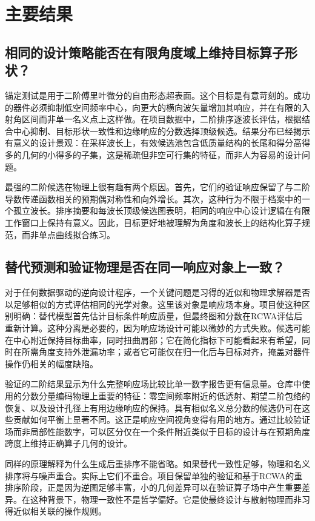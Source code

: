 \section{主要结果}

\subsection{相同的设计策略能否在有限角度域上维持目标算子形状？}

锚定测试是用于二阶傅里叶微分的自由形态超表面。这个目标是有意苛刻的。成功的器件必须抑制低空间频率中心，向更大的横向波矢量增加其响应，并在有限的入射角区间而非单一名义点上这样做。在项目数据中，二阶排序逐波长评估，根据结合中心抑制、目标形状一致性和边缘响应的分数选择顶级候选。结果分布已经揭示有意义的设计景观：在采样波长上，有效候选池包含低质量结构的长尾和得分高得多的几何的小得多的子集，这是稀疏但非空可行集的特征，而非人为容易的设计问题。

最强的二阶候选在物理上很有趣有两个原因。首先，它们的验证响应保留了与二阶导数传递函数相关的预期偶对称性和向外增长。其次，这种行为不限于档案中的一个孤立波长。排序摘要和每波长顶级候选图表明，相同的响应中心设计逻辑在有限工作窗口上保持有意义。因此，目标更好地被理解为角度和波长上的结构化算子规范，而非单点曲线拟合练习。

\subsection{替代预测和验证物理是否在同一响应对象上一致？}

对于任何数据驱动的逆向设计程序，一个关键问题是习得的近似和物理求解器是否以足够相似的方式评估相同的光学对象。这里该对象是响应场本身。项目使这种区别明确：替代模型首先估计目标条件响应质量，但最终图和分数在RCWA评估后重新计算。这种分离是必要的，因为响应场设计可能以微妙的方式失败。候选可能在中心附近保持目标曲率，同时扭曲肩部；它在简化指标下可能看起来有希望，同时在所需角度支持外泄漏功率；或者它可能仅在归一化后与目标对齐，掩盖对器件操作仍相关的幅度缺陷。

验证的二阶结果显示为什么完整响应场比较比单一数字报告更有信息量。仓库中使用的分数分量编码物理上重要的特征：零空间频率附近的低透射、期望二阶包络的恢复、以及设计孔径上有用边缘响应的保持。具有相似名义总分数的候选仍可在这些贡献如何平衡上显著不同。这正是响应空间视角变得有用的地方。通过比较验证场而非局部性能数字，可以区分仅在一个条件附近类似于目标的设计与在预期角度跨度上维持正确算子几何的设计。

同样的原理解释为什么生成后重排序不能省略。如果替代一致性足够，物理和名义排序将与噪声重合。实际上它们不重合。项目保留单独的验证和基于RCWA的重排序阶段，正是因为逆图足够丰富，小的几何差异可以在验证算子场中产生重要差异。在这种背景下，物理一致性不是哲学偏好。它是使最终设计与散射物理而非习得近似相关联的操作规则。

